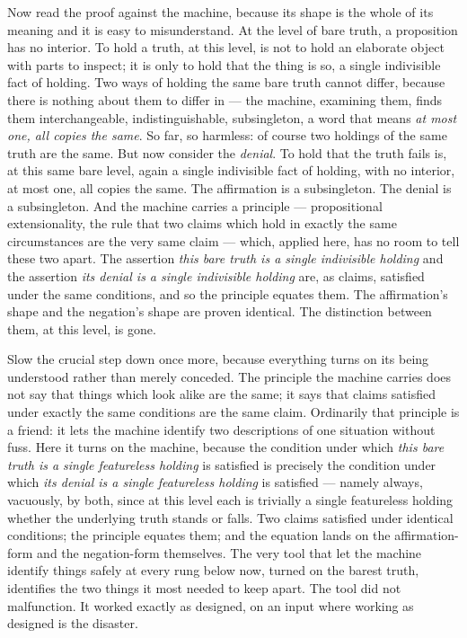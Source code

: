 Now read the proof against the machine, because its shape is the whole of its meaning and it is easy to
misunderstand. At the level of bare truth, a proposition has no interior. To hold a truth, at this level, is not
to hold an elaborate object with parts to inspect; it is only to hold that the thing is so, a single indivisible
fact of holding. Two ways of holding the same bare truth cannot differ, because there is nothing about them to
differ in --- the machine, examining them, finds them interchangeable, indistinguishable, subsingleton, a word
that means \emph{at most one, all copies the same}. So far, so harmless: of course two holdings of the same truth
are the same. But now consider the \emph{denial}. To hold that the truth fails is, at this same bare level, again
a single indivisible fact of holding, with no interior, at most one, all copies the same. The affirmation is a
subsingleton. The denial is a subsingleton. And the machine carries a principle --- propositional extensionality,
the rule that two claims which hold in exactly the same circumstances are the very same claim --- which, applied
here, has no room to tell these two apart. The assertion \emph{this bare truth is a single indivisible holding}
and the assertion \emph{its denial is a single indivisible holding} are, as claims, satisfied under the same
conditions, and so the principle equates them. The affirmation's shape and the negation's shape are proven
identical. The distinction between them, at this level, is gone.

Slow the crucial step down once more, because everything turns on its being understood rather than merely
conceded. The principle the machine carries does not say that things which look alike are the same; it says that
claims satisfied under exactly the same conditions are the same claim. Ordinarily that principle is a friend: it
lets the machine identify two descriptions of one situation without fuss. Here it turns on the machine, because
the condition under which \emph{this bare truth is a single featureless holding} is satisfied is precisely the
condition under which \emph{its denial is a single featureless holding} is satisfied --- namely always, vacuously,
by both, since at this level each is trivially a single featureless holding whether the underlying truth stands or
falls. Two claims satisfied under identical conditions; the principle equates them; and the equation lands on the
affirmation-form and the negation-form themselves. The very tool that let the machine identify things safely at
every rung below now, turned on the barest truth, identifies the two things it most needed to keep apart. The tool
did not malfunction. It worked exactly as designed, on an input where working as designed is the disaster.

